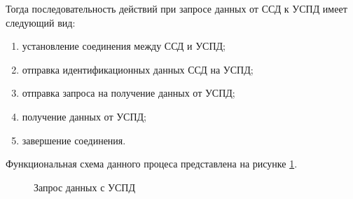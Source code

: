 Тогда последовательность действий при запросе данных от ССД к УСПД имеет следующий вид:

\begin{enumerate}
 \item установление соединения между ССД и УСПД;
 \item отправка идентификационных данных ССД на УСПД;
 \item отправка запроса на получение данных от УСПД;
 \item получение данных от УСПД;
 \item завершение соединения.
\end{enumerate}

Функциональная схема данного процеса представлена на рисунке \ref{img:get_data_idef0}.

\begin{figure}[!ht]
 \caption{Запрос данных с УСПД}
 \label{img:get_data_idef0}
\end{figure}